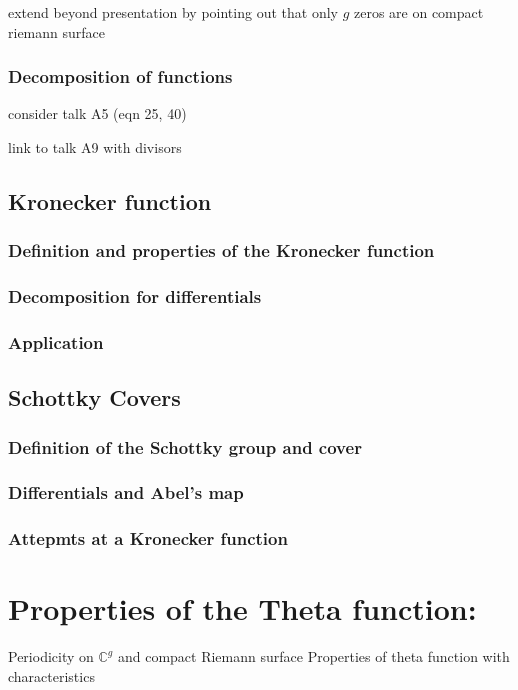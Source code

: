 extend beyond presentation by pointing out that only $g$ zeros are on compact riemann surface

\subsection{Decomposition of functions}
consider talk A5 (eqn 25, 40)

link to talk A9 with divisors

\section{Kronecker function}

\subsection{Definition and properties of the Kronecker function}

\subsection{Decomposition for differentials}

\subsection{Application}

\section{Schottky Covers}

\subsection{Definition of the Schottky group and cover}
\cite{Cha22}
\cite{ComputationalSchottky}

\subsection{Differentials and Abel's map}
\cite{Cha22}
\cite{ComputationalSchottky}

\subsection{Attepmts at a Kronecker function}
\cite{Cha22}




\appendix

\chapter{Properties of the Theta function:}
Periodicity on $\mathbb C^g$ and compact Riemann surface
Properties of theta function with characteristics
